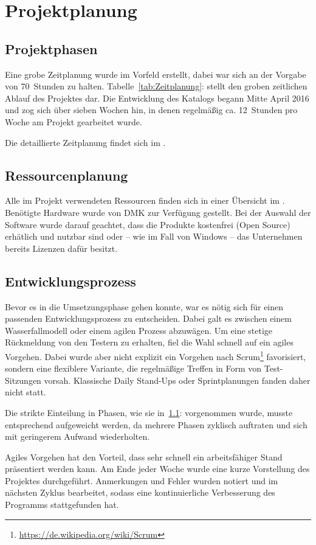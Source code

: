 \section{Projektplanung} 
\label{sec:Projektplanung}

\subsection{Projektphasen}
\label{sec:Projektphasen}
Eine grobe Zeitplanung wurde im Vorfeld erstellt, dabei war sich an der Vorgabe
von 70~Stunden zu halten. Tabelle~\ref{tab:Zeitplanung}:
 stellt den groben zeitlichen Ablauf des Projektes dar.
Die Entwicklung des Katalogs begann Mitte April 2016 und zog sich über sieben
Wochen hin, in denen regelmäßig ca. 12~Stunden pro Woche am Projekt gearbeitet
wurde.


Die detaillierte Zeitplanung findet sich im .

\subsection{Ressourcenplanung}
\label{sec:Ressourcenplanung}
Alle im Projekt verwendeten Ressourcen finden sich in einer Übersicht im
. Benötigte Hardware wurde von \acs{DMK} zur
Verfügung gestellt. Bei der Auswahl der Software wurde darauf geachtet, dass die
Produkte kostenfrei (\zB Open Source) erhätlich und nutzbar sind oder -- wie im
Fall von Windows -- das Unternehmen bereits Lizenzen dafür besitzt.

\subsection{Entwicklungsprozess}
\label{sec:Entwicklungsprozess}
Bevor es in die Umsetzungsphase gehen konnte, war es nötig sich für einen
passenden Entwicklungsprozess zu entscheiden. Dabei galt es zwischen einem
Wasserfallmodell oder einem agilen Prozess abzuwägen. Um eine stetige
Rückmeldung von den Testern zu erhalten, fiel die Wahl schnell auf ein agiles
Vorgehen. Dabei wurde aber nicht explizit ein Vorgehen nach
Scrum\footnote{\url{https://de.wikipedia.org/wiki/Scrum}} favorisiert, sondern eine flexiblere Variante, die regelmäßige Treffen in Form von
Test-Sitzungen vorsah. Klassische Daily Stand-Ups oder Sprintplanungen fanden
daher nicht statt.

Die strikte Einteilung in Phasen, wie sie in~\ref{sec:Projektphasen}:
 vorgenommen wurde, musste entsprechend aufgeweicht
werden, da mehrere Phasen zyklisch auftraten und sich mit geringerem Aufwand
wiederholten.

Agiles Vorgehen hat den Vorteil, dass sehr schnell ein arbeitsfähiger Stand
präsentiert werden kann. Am Ende jeder Woche wurde eine kurze Vorstellung des
Projektes durchgeführt. Anmerkungen und Fehler wurden notiert und im nächsten
Zyklus bearbeitet, sodass eine kontinuierliche Verbesserung des Programms
stattgefunden hat.